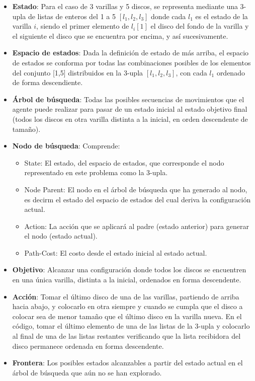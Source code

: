 \documentclass[12pt]{article}
\begin{document}
    \begin{itemize}
        \item \textbf{Estado}: Para el caso de 3 varillas y 5 discos, se representa mediante una 3-upla de listas de enteros del 1 a 5 $[l_{1},l_{2},l_{3}]$ donde cada $l_{1}$ es el estado de la varilla $i$, siendo el primer elemento de $l_{i}[1]$ el disco del fondo de la varilla y el siguiente el disco que se encuentra por encima, y así sucesivamente.
        \item \textbf{Espacio de estados}: Dada la definición de estado de más arriba, el espacio de estados se conforma por todas las combinaciones posibles de los elementos del conjunto [1,5] distribuidos en la 3-upla $[l_{1},l_{2},l_{3}]$, con cada $l_{1}$ ordenado de forma descendiente.
        \item \textbf{Árbol de búsqueda}: Todas las posibles secuencias de movimientos que el agente puede realizar para pasar de un estado inicial al estado objetivo final (todos los discos en otra varilla distinta a la inicial, en orden descendente de tamaño).
        \item \textbf{Nodo de búsqueda}: Comprende: 
            \begin{itemize}
                \item State: El estado, del espacio de estados, que corresponde el nodo representado en este problema como la 3-upla.
                \item Node Parent: El nodo en el árbol de búsqueda que ha generado al nodo, es decirm el estado del espacio de estados del cual deriva la configuración actual.
                \item Action: La acción que se aplicará al padre (estado anterior) para generar el nodo (estado actual).
                \item Path-Cost: El costo desde el estado inicial al estado actual.
            \end{itemize}
        \item \textbf{Objetivo}: Alcanzar una configuración donde todos los discos se encuentren en una única varilla, distinta a la inicial, ordenados en forma descendente.
        \item \textbf{Acción}: Tomar el último disco de una de las varillas, partiendo de arriba hacia abajo, y colocarlo en otra siempre y cuando se cumpla que el disco a colocar sea de menor tamaño que el último disco en la varilla nueva. En el código, tomar el último elemento de una de las listas de la 3-upla y colocarlo al final de una de las listas restantes verificando que la lista recibidora del disco permanece ordenada en forma descendente.
        \item \textbf{Frontera}: Los posibles estados alcanzables a partir del estado actual en el árbol de búsqueda que aún no se han explorado.
    \end{itemize}
\newpage
\end{document}
